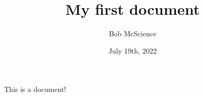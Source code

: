 \documentclass{article}
\title{My first document}
\author{Bob McScience}
\date{July 19th, 2022}
\begin{document}
\maketitle
	This is a document!
\end{document}
